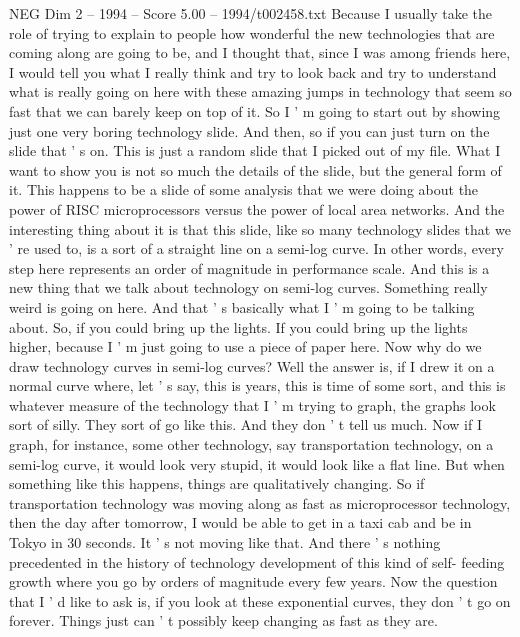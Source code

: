 \begin{textsample}{NEG Dim 2 – 1994 – Score 5.00 – 1994/t002458.txt}  \label{ex:f2_neg_077}
Because I usually take the role of trying to explain to people how wonderful the new technologies that are coming along are going to be, and I thought that, since I was among friends here, I would tell you what I really think and try to look back and try to understand what is really going on here with these amazing jumps in technology that seem so fast that we can barely keep on top of it.
So I ' m going to start out by showing just one very boring technology slide.
And then, so if you can just turn on the slide that ' s on.
This is just a random slide that I picked out of my file.
What I want to show you is not so much the details of the slide, but the general form of it.
This happens to be a slide of some analysis that we were doing about the power of RISC microprocessors versus the power of local area networks.
And the interesting thing about it is that this slide, like so many technology slides that we ' re used to, is a sort of a straight line on a semi-log curve.
In other words, every step here represents an order of magnitude in performance scale.
And this is a new thing that we talk about technology on semi-log curves.
Something really weird is going on here.
And that ' s basically what I ' m going to be talking about.
So, if you could bring up the lights.
If you could bring up the lights higher, because I ' m just going to use a piece of paper here.
Now why do we draw technology curves in semi-log curves?
Well the answer is, if I drew it on a normal curve where, let ' s say, this is years, this is time of some sort, and this is whatever measure of the technology that I ' m trying to graph, the graphs look sort of silly.
They sort of go like this.
And they don ' t tell us much.
Now if I graph, for instance, some other technology, say transportation technology, on a semi-log curve, it would look very stupid, it would look like a flat line.
But when something like this happens, things are qualitatively changing.
So if transportation technology was moving along as fast as microprocessor technology, then the day after tomorrow, I would be able to get in a taxi cab and be in Tokyo in 30 seconds.
It ' s not moving like that.
And there ' s nothing precedented in the history of technology development of this kind of self- feeding growth where you go by orders of magnitude every few years.
Now the question that I ' d like to ask is, if you look at these exponential curves, they don ' t go on forever.
Things just can ' t possibly keep changing as fast as they are.

\end{textsample}

